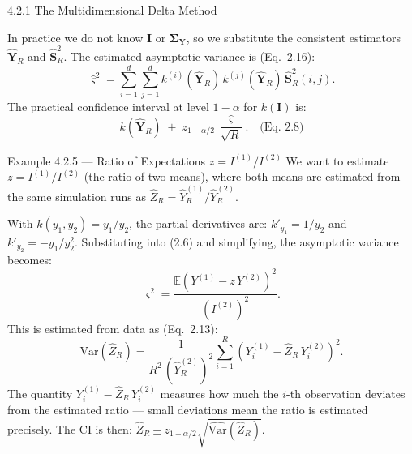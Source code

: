 \documentclass[aspectratio=169,10pt]{beamer}
\begin{document}
\begin{frame}[allowframebreaks]{4.2.1 The Multidimensional Delta Method}
\framebreak

In practice we do not know $\mathbf{I}$ or $\boldsymbol{\Sigma}_{\mathbf{Y}}$,
so we substitute the consistent estimators $\hat{\mathbf{Y}}_R$ and
$\hat{\mathbf{S}}_R^2$.  The estimated asymptotic variance is (Eq.\ 2.16):
\[
  \hat{\varsigma}^2 = \sum_{i=1}^d\sum_{j=1}^d k^{(i)}(\hat{\mathbf{Y}}_R)\,
    k^{(j)}(\hat{\mathbf{Y}}_R)\,\hat{\mathbf{S}}_R^2(i,j).
\]
The practical confidence interval at level $1-\alpha$ for $k(\mathbf{I})$ is:
\[
  k(\hat{\mathbf{Y}}_R) \;\pm\; z_{1-\alpha/2}\,\frac{\hat{\varsigma}}{\sqrt{R}}.
  \quad \text{(Eq.\ 2.8)}
\]

\begin{exampleblock}{Example 4.2.5 --- Ratio of Expectations $z = I^{(1)}/I^{(2)}$}
  We want to estimate $z = I^{(1)}/I^{(2)}$ (the ratio of two means),
  where both means are estimated from the same simulation runs as
  $\hat{Z}_R = \hat{Y}_R^{(1)}/\hat{Y}_R^{(2)}$.

  With $k(y_1, y_2) = y_1/y_2$, the partial derivatives are:
  $k'_{y_1} = 1/y_2$ and $k'_{y_2} = -y_1/y_2^2$.  Substituting
  into (2.6) and simplifying, the asymptotic variance becomes:
  \[
    \varsigma^2 = \frac{\mathbb{E}(Y^{(1)} - z\,Y^{(2)})^2}{(I^{(2)})^2}.
  \]
  This is estimated from data as (Eq.\ 2.13):
  \[
    \widehat{\mathrm{Var}}(\hat{Z}_R)
      = \frac{1}{R^2\,(\hat{Y}_R^{(2)})^2}\sum_{i=1}^R
        (Y_i^{(1)} - \hat{Z}_R\,Y_i^{(2)})^2.
  \]
  The quantity $Y_i^{(1)} - \hat{Z}_R\,Y_i^{(2)}$ measures how much the
  $i$-th observation deviates from the estimated ratio --- small deviations
  mean the ratio is estimated precisely.  The CI is then:
  $\hat{Z}_R \pm z_{1-\alpha/2}\sqrt{\widehat{\mathrm{Var}}(\hat{Z}_R)}$.
\end{exampleblock}

\end{frame}
\end{document}
